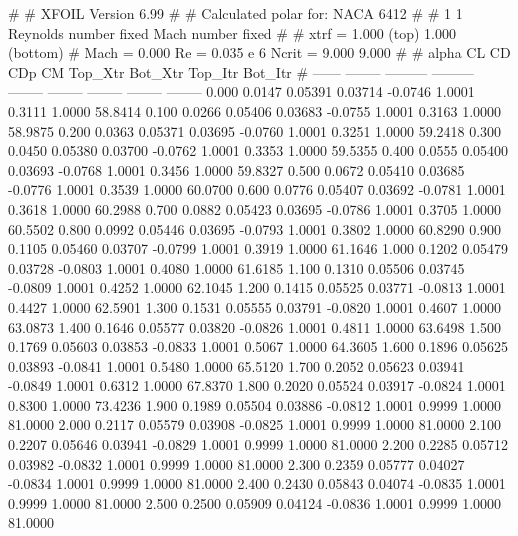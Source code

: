 #  
#       XFOIL         Version 6.99
#  
# Calculated polar for: NACA 6412                                       
#  
# 1 1 Reynolds number fixed          Mach number fixed         
#  
# xtrf =   1.000 (top)        1.000 (bottom)  
# Mach =   0.000     Re =     0.035 e 6     Ncrit =   9.000  9.000
#  
#   alpha    CL        CD       CDp       CM     Top_Xtr  Bot_Xtr  Top_Itr  Bot_Itr
#  ------ -------- --------- --------- -------- -------- -------- -------- --------
   0.000   0.0147   0.05391   0.03714  -0.0746   1.0001   0.3111   1.0000  58.8414
   0.100   0.0266   0.05406   0.03683  -0.0755   1.0001   0.3163   1.0000  58.9875
   0.200   0.0363   0.05371   0.03695  -0.0760   1.0001   0.3251   1.0000  59.2418
   0.300   0.0450   0.05380   0.03700  -0.0762   1.0001   0.3353   1.0000  59.5355
   0.400   0.0555   0.05400   0.03693  -0.0768   1.0001   0.3456   1.0000  59.8327
   0.500   0.0672   0.05410   0.03685  -0.0776   1.0001   0.3539   1.0000  60.0700
   0.600   0.0776   0.05407   0.03692  -0.0781   1.0001   0.3618   1.0000  60.2988
   0.700   0.0882   0.05423   0.03695  -0.0786   1.0001   0.3705   1.0000  60.5502
   0.800   0.0992   0.05446   0.03695  -0.0793   1.0001   0.3802   1.0000  60.8290
   0.900   0.1105   0.05460   0.03707  -0.0799   1.0001   0.3919   1.0000  61.1646
   1.000   0.1202   0.05479   0.03728  -0.0803   1.0001   0.4080   1.0000  61.6185
   1.100   0.1310   0.05506   0.03745  -0.0809   1.0001   0.4252   1.0000  62.1045
   1.200   0.1415   0.05525   0.03771  -0.0813   1.0001   0.4427   1.0000  62.5901
   1.300   0.1531   0.05555   0.03791  -0.0820   1.0001   0.4607   1.0000  63.0873
   1.400   0.1646   0.05577   0.03820  -0.0826   1.0001   0.4811   1.0000  63.6498
   1.500   0.1769   0.05603   0.03853  -0.0833   1.0001   0.5067   1.0000  64.3605
   1.600   0.1896   0.05625   0.03893  -0.0841   1.0001   0.5480   1.0000  65.5120
   1.700   0.2052   0.05623   0.03941  -0.0849   1.0001   0.6312   1.0000  67.8370
   1.800   0.2020   0.05524   0.03917  -0.0824   1.0001   0.8300   1.0000  73.4236
   1.900   0.1989   0.05504   0.03886  -0.0812   1.0001   0.9999   1.0000  81.0000
   2.000   0.2117   0.05579   0.03908  -0.0825   1.0001   0.9999   1.0000  81.0000
   2.100   0.2207   0.05646   0.03941  -0.0829   1.0001   0.9999   1.0000  81.0000
   2.200   0.2285   0.05712   0.03982  -0.0832   1.0001   0.9999   1.0000  81.0000
   2.300   0.2359   0.05777   0.04027  -0.0834   1.0001   0.9999   1.0000  81.0000
   2.400   0.2430   0.05843   0.04074  -0.0835   1.0001   0.9999   1.0000  81.0000
   2.500   0.2500   0.05909   0.04124  -0.0836   1.0001   0.9999   1.0000  81.0000
